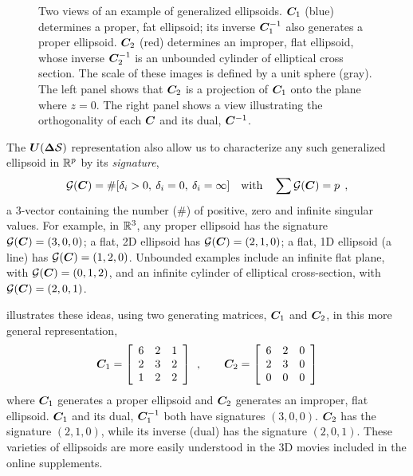 \begin{figure}[htb]
\begin{minipage}[b]{.49\linewidth}
 \end{minipage}
\caption{Two views of an example of generalized ellipsoids.  $\bm{C}_1$  (blue) determines a proper, fat ellipsoid;
its inverse $\bm{C}_1^{-1}$ also generates a proper ellipsoid. $\bm{C}_2$  (red) determines an improper, flat ellipsoid,
whose inverse $\bm{C}_2^{-1}$ is an unbounded cylinder of elliptical cross section.  The scale of these images is defined
by a unit sphere (gray). The left panel shows that $\bm{C}_2$ is a projection of  $\bm{C}_1$ onto the plane where
$z=0$.
The right panel shows a view illustrating the orthogonality of each $\bm{C}$ and its dual,  $\bm{C}^{-1}$.
}
\label{fig:gell3d}
\end{figure}

The $\bm{U} (\bm{\Delta} \mathcal{S})$ representation also allow us to characterize any such
generalized ellipsoid in $\mathbb{R}^{p}$ by its \emph{signature},
\begin{equation}
 \mathcal{G}(\bm{C}) = \#[ \delta_i >0, \: \delta_i =0, \: \delta_i =\infty ] \quad \mbox{with} \quad \sum \mathcal{G}(\bm{C}) = p\:\: ,
\end{equation}
a 3-vector containing the number ($\#$) of positive, zero and infinite singular values.  For example, in $\mathbb{R}^{3}$, any proper ellipsoid has
the signature $\mathcal{G}(\bm{C})=(3, 0, 0)$; a flat, 2D ellipsoid has $\mathcal{G}(\bm{C})=(2, 1, 0)$; a flat, 1D ellipsoid (a line)
has $\mathcal{G}(\bm{C})=(1, 2, 0)$. Unbounded examples include an infinite flat plane, with $\mathcal{G}(\bm{C})=(0, 1, 2)$,
and an infinite cylinder of elliptical cross-section, with $\mathcal{G}(\bm{C})=(2, 0, 1)$.


 illustrates these ideas, using two generating matrices, $\bm{C}_1$ and $\bm{C}_2$, in this more
general representation,
\[
\bm{C}_1 = \left[
\begin{array}{ccc}
 6 & 2 & 1  \\
 2 & 3 & 2  \\
 1 & 2 & 2
\end{array}
\right]
\:\: , \quad\quad
\bm{C}_2 = \left[
\begin{array}{ccc}
 6 & 2 & 0  \\
 2 & 3 & 0  \\
 0 & 0 & 0
\end{array}
\right]
\]
where $\bm{C}_1$ generates a proper ellipsoid and $\bm{C}_2$ generates an improper, flat ellipsoid.
 $\bm{C}_1$ and its dual,  $\bm{C}_1^{-1}$ both have signatures $(3, 0, 0)$.
$\bm{C}_2$ has the signature $(2, 1, 0)$, while its inverse (dual) has the signature $(2, 0, 1)$.
These varieties of ellipsoids are more easily understood in the 3D movies included in the online supplements.

